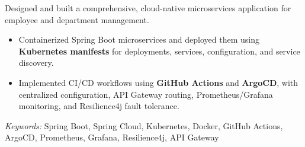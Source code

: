 \noindent
{}

\noindent
Designed and built a comprehensive, cloud-native microservices application for employee and department management.

\begin{itemize}
    \item Containerized Spring Boot microservices and deployed them using \textbf{Kubernetes manifests} for deployments, services, configuration, and service discovery.
    \item Implemented CI/CD workflows using \textbf{GitHub Actions} and \textbf{ArgoCD}, with centralized configuration, API Gateway routing, Prometheus/Grafana monitoring, and Resilience4j fault tolerance.
\end{itemize}

\noindent
\textit{Keywords:} Spring Boot, Spring Cloud, Kubernetes, Docker, GitHub Actions, ArgoCD, Prometheus, Grafana, Resilience4j, API Gateway
